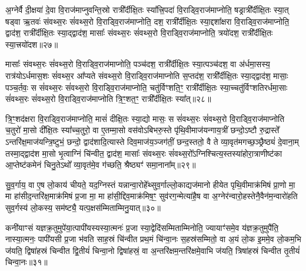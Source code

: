 {\anuvakamend[{अ॒ग्निस्तथ्स॒ꣴ॒स्कृत्या॒ग्नेर्दश॑ च॥६॥}]}

अ॒ग्नेर्वै दी॒क्षया॑ दे॒वा वि॒राज॑माप्नुवन्ति॒स्रो रात्री᳚र्दीक्षि॒तः स्या᳚त्त्रि॒पदा॑ वि॒राड्वि॒राज॑माप्नोति॒ षड्रात्री᳚र्दीक्षि॒तः स्या॒त् षड्वा ऋ॒तवः॑ संवथ्स॒रः सं॑वथ्स॒रो वि॒राड्वि॒राज॑माप्नोति॒ दश॒ रात्री᳚र्दीक्षि॒तः स्या॒द्दशा᳚क्षरा वि॒राड्वि॒राज॑माप्नोति॒ द्वाद॑श॒ रात्री᳚र्दीक्षि॒तः स्या॒द्द्वाद॑श॒ मासाः᳚ संवथ्स॒रः सं॑वथ्स॒रो वि॒राड्वि॒राज॑माप्नोति॒ त्रयो॑दश॒ रात्री᳚र्दीक्षि॒तः स्या॒त्त्रयो॑दश॥२७॥

मासाः᳚ संवथ्स॒रः सं॑वथ्स॒रो वि॒राड्वि॒राज॑माप्नोति॒ पञ्च॑दश॒ रात्री᳚र्दीक्षि॒तः स्या॒त्पञ्च॑दश॒ वा अ॑र्धमा॒सस्य॒ रात्र॑यो\-ऽर्धमास॒शः सं॑वथ्स॒र आ᳚प्यते संवथ्स॒रो वि॒राड्वि॒राज॑माप्नोति स॒प्तद॑श॒ रात्री᳚र्दीक्षि॒तः स्या॒द्द्वाद॑श॒ मासाः॒ पञ्च॒र्तवः॒ स सं॑वथ्स॒रः सं॑वथ्स॒रो वि॒राड्वि॒राज॑माप्नोति॒ चतु॑र्विꣳशति॒ꣳ॒ रात्री᳚र्दीक्षि॒तः स्या॒च्चतु॑र्विꣳशतिरर्धमा॒साः सं॑वथ्स॒रः सं॑वथ्स॒रो वि॒राड्वि॒राज॑माप्नोति त्रि॒ꣳ॒शत॒ꣳ॒ रात्री᳚र्दीक्षि॒तः स्या᳚त्॥२८॥

त्रि॒ꣳ॒शद॑क्षरा वि॒राड्वि॒राज॑माप्नोति॒ मासं॑ दीक्षि॒तः स्या॒द्यो मासः॒ स सं॑वथ्स॒रः सं॑वथ्स॒रो वि॒राड्वि॒राज॑माप्नोति च॒तुरो॑ मा॒सो दी᳚क्षि॒तः स्या᳚च्च॒तुरो॒ वा ए॒तम्मा॒सो वस॑वो\-ऽबिभरु॒स्ते पृ॑थि॒वीमाज॑यन्गाय॒त्रीं छन्दो॒\-ऽष्टौ रु॒द्रास्ते᳚ \-ऽन्तरि॑क्ष॒माज॑यन्त्रि॒ष्टुभं॒ छन्दो॒ द्वाद॑शादि॒त्यास्ते दिव॒माज॑य॒ञ्जग॑तीं॒ छन्द॒स्ततो॒ वै ते व्या॒वृत॑मगच्छ॒ञ्छ्रैष्ठ्यं॑ दे॒वाना॒म् तस्मा॒द्द्वाद॑श मा॒सो भृ॒त्वाग्निं चि॑न्वीत॒ द्वाद॑श॒ मासाः᳚ संवथ्स॒रः सं॑वथ्स॒रो᳚\-ऽग्निश्चित्य॒स्तस्या॑होरा॒त्राणीष्ट॑का आ॒प्तेष्ट॑कमेनं चिनु॒ते\-ऽथो᳚ व्या॒वृत॑मे॒व ग॑च्छति॒ श्रैष्ठ्यꣳ॑ समा॒नाना᳚म्॥२९॥

{\anuvakamend[{स्या॒त्त्रयो॑दश त्रि॒ꣳ॒शत॒ꣳ॒ रात्री᳚र्दीक्षि॒तः स्या॒द्वै ते᳚\-ऽष्टाविꣳ॑शतिश्च॥७॥}]}

सु॒व॒र्गाय॒ वा ए॒ष लो॒काय॑ चीयते॒ यद॒ग्निस्तं यन्नान्वा॒रोहे᳚थ्सुव॒र्गाल्लो॒काद्यज॑मानो हीयेत पृथि॒वीमाक्र॑मिषं प्रा॒णो मा॒ मा हा॑सीद॒न्तरि॑क्ष॒माक्र॑मिषं प्र॒जा मा॒ मा हा॑सी॒द्दिव॒माक्र॑मिष॒ꣳ॒ सुव॑रग॒न्मेत्या॑है॒ष वा अ॒ग्नेर॑न्वारो॒हस्तेनै॒वैन॑\-म॒न्वारो॑हति सुव॒र्गस्य॑ लो॒कस्य॒ सम॑ष्ट्यै॒ यत्प॒क्षस॑म्मिताम्मिनु॒यात्॥३०॥

कनी॑याꣳसं यज्ञक्र॒तुमुपे॑या॒त्पापी॑यस्यस्या॒त्मनः॑ प्र॒जा स्या॒द्वेदि॑सम्मिताम्मिनोति॒ ज्यायाꣳ॑समे॒व य॑ज्ञक्र॒तुमुपै॑ति॒ नास्या॒त्मनः॒ पापी॑यसी प्र॒जा भ॑वति साह॒स्रं चि॑न्वीत प्रथ॒मं चि॑न्वा॒नः स॒हस्र॑सम्मितो॒ वा अ॒यं लो॒क इ॒ममे॒व लो॒कम॒भि ज॑यति॒ द्विषा॑हस्रं चिन्वीत द्वि॒तीयं॑ चिन्वा॒नो द्विषा॑हस्रं॒ वा अ॒न्तरि॑क्षम॒न्तरि॑क्षमे॒वाभि ज॑यति॒ त्रिषा॑हस्रं चिन्वीत तृ॒तीयं॑ चिन्वा॒नः॥३१॥

